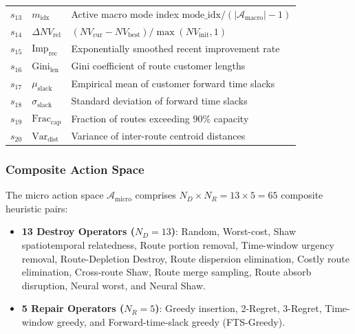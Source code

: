 \documentclass{ieeeaccess}
\begin{document}
\begin{table}[!b]
\begin{tabularx}{\columnwidth}{c l X}
$s_{13}$ & $m_{\text{idx}}$ & Active macro mode index $\text{mode\_idx} / (|\mathcal{A}_{\text{macro}}| - 1)$ \\
$s_{14}$ & $\Delta NV_{\text{rel}}$ & $(NV_{\text{cur}} - NV_{\text{best}}) / \max(NV_{\text{init}}, 1)$ \\
$s_{15}$ & $\text{Imp}_{\text{rec}}$ & Exponentially smoothed recent improvement rate \\
$s_{16}$ & $\text{Gini}_{\text{len}}$ & Gini coefficient of route customer lengths \\
$s_{17}$ & $\mu_{\text{slack}}$ & Empirical mean of customer forward time slacks \\
$s_{18}$ & $\sigma_{\text{slack}}$ & Standard deviation of forward time slacks \\
$s_{19}$ & $\text{Frac}_{\text{cap}}$ & Fraction of routes exceeding $90\%$ capacity \\
$s_{20}$ & $\text{Var}_{\text{dist}}$ & Variance of inter-route centroid distances \\
\bottomrule
\end{tabularx}
\end{table}

\subsubsection{Composite Action Space}
The micro action space $\mathcal{A}_{\text{micro}}$ comprises $N_D \times N_R = 13 \times 5 = 65$ composite heuristic pairs:
\begin{itemize}
    \item \textbf{13 Destroy Operators ($N_D=13$)}: Random, Worst-cost, Shaw spatiotemporal relatedness, Route portion removal, Time-window urgency removal, Route-Depletion Destroy, Route dispersion elimination, Costly route elimination, Cross-route Shaw, Route merge sampling, Route absorb disruption, Neural worst, and Neural Shaw.
    \item \textbf{5 Repair Operators ($N_R=5$)}: Greedy insertion, 2-Regret, 3-Regret, Time-window greedy, and Forward-time-slack greedy (FTS-Greedy).
\end{itemize}
\end{document}

